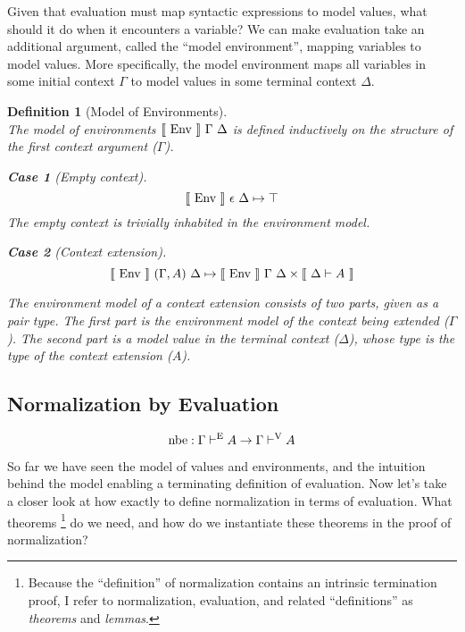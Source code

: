 \documentclass{llncs}
\newtheorem{defin}{Definition}
\newtheorem{subdefin}{Case}
\def\cross{\times}
\def\dfn{\mapsto}
\def\marr{\rightarrow}
\def\emp{\epsilon}
\newcommand{\turn}[1]{\vdash^\con{#1}}
\newcommand{\el}[1]{\llbracket ~ #1 ~ \rrbracket}
\newcommand{\con}[1]{\textmd{#1}}
\newcommand{\fun}[1]{\textmd{#1}}
\newcommand{\dtypm}[1]{\el{\Delta \vdash #1}}
\newcommand{\type}[1]{\Gamma \turn{E} #1}
\newcommand{\typv}[1]{\Gamma \turn{V} #1}
\def\menv{\el{\fun{Env}}~\Gamma~\Delta}
\newcommand{\dmenv}[1]{\el{\fun{Env}}~#1~\Delta}
\begin{document}
Given that evaluation must map syntactic expressions to model values,
what should it do when it encounters a variable? We can make
evaluation take an additional argument, called the
``model environment'', mapping variables to model values. More
specifically, the model environment maps all variables in
some initial context $\Gamma$ to model values in some terminal context
$\Delta$.


\begin{defin}[Model of Environments]
\label{def:menv}
$ $\\
The model of environments $\menv$ is defined inductively on the structure
of the first context argument ($\Gamma$).

\begin{subdefin}[Empty context]
$$
\dmenv{\emp} \dfn \top
$$
The empty context is trivially inhabited in the environment model.
\end{subdefin}

\begin{subdefin}[Context extension]
$$
\dmenv{(\Gamma, A)} \dfn \dmenv{\Gamma} \cross \dtypm{A}
$$

The environment model of a context extension consists of two parts,
given as a pair type. The first part
is the environment model of the context being extended ($\Gamma$). The second part
is a model value in the terminal context ($\Delta$),
whose type is the type of the context extension ($A$).

\end{subdefin}

\end{defin}

\subsection{Normalization by Evaluation}

$$
\fun{nbe} : \type{A} \marr \typv{A}
$$

So far we have seen the model of values and environments, and the
intuition behind the model enabling a terminating definition of evaluation.
Now let's take a closer look at how exactly to define normalization in
terms of evaluation. What theorems 
\footnote{Because the ``definition'' of normalization contains an
intrinsic termination proof, I refer to normalization, evaluation, and
related ``definitions'' as \textit{theorems} and \textit{lemmas}.}
do we need, and how do we instantiate these theorems in the proof of
normalization?
\end{document}
